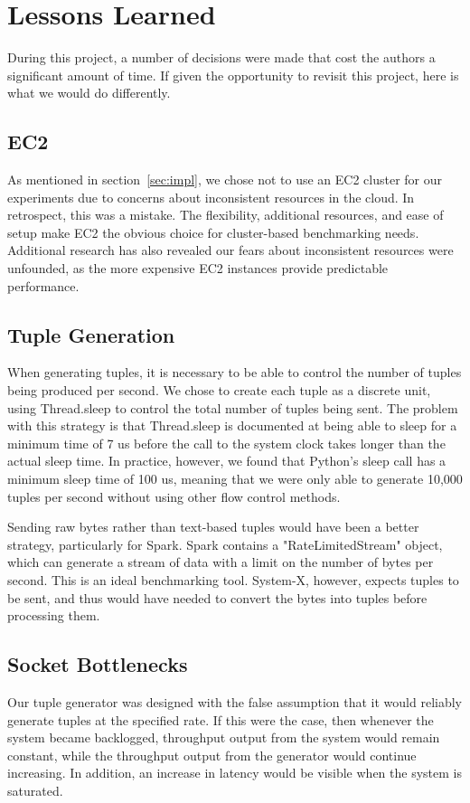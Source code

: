 \section{Lessons Learned}
\label{sec:lessons}
During this project, a number of decisions were made that cost the authors a significant amount of time.  If given the opportunity to revisit this project, here is what we would do differently.

\subsection{EC2}
As mentioned in section~\ref{sec:impl}, we chose not to use an EC2 cluster for our experiments due to concerns about inconsistent resources in the cloud.  In retrospect, this was a mistake.  The flexibility, additional resources, and ease of setup make EC2 the obvious choice for cluster-based benchmarking needs.  Additional research has also revealed our fears about inconsistent resources were unfounded, as the more expensive EC2 instances provide predictable performance.

\subsection{Tuple Generation}
When generating tuples, it is necessary to be able to control the number of tuples being produced per second.  We chose to create each tuple as a discrete unit, using Thread.sleep to control the total number of tuples being sent.  The problem with this strategy is that Thread.sleep is documented at being able to sleep for a minimum time of 7 us before the call to the system clock takes longer than the actual sleep time.  In practice, however, we found that Python's sleep call has a minimum sleep time of 100 us, meaning that we were only able to generate 10,000 tuples per second without using other flow control methods.

Sending raw bytes rather than text-based tuples would have been a better strategy, particularly for Spark.  Spark contains a "RateLimitedStream" object, which can generate a stream of data with a limit on the number of bytes per second.  This is an ideal benchmarking tool.  System-X, however, expects tuples to be sent, and thus would have needed to convert the bytes into tuples before processing them.

\subsection{Socket Bottlenecks}
Our tuple generator was designed with the false assumption that it would reliably generate tuples at the specified rate.  If this were the case, then whenever the system became backlogged, throughput output from the system would remain constant, while the throughput output from the generator would continue increasing.  In addition, an increase in latency would be visible when the system is saturated.

